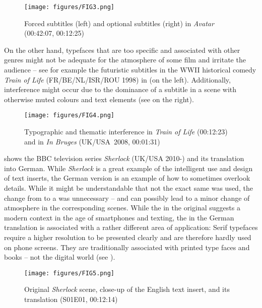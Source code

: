 \begin{figure}[t]
\texttt{[image: figures/FIG3.png]}
\caption{Forced subtitles (left) and optional subtitles (right) in \textit{Avatar} (00:42:07, 00:12:25)}
\label{fig:FIG3}
\end{figure}

On the other hand, typefaces that are too specific and associated with other genres might not be adequate for the atmosphere of some film and irritate the audience – see for example the futuristic subtitles in the WWII historical comedy \textit{Train of Life} (FR/BE/NL/ISR/ROU 1998) in  (on the left). Additionally, interference might occur due to the dominance of a subtitle in a scene with otherwise muted colours and text elements (see  on the right).

\begin{figure}[t]
\texttt{[image: figures/FIG4.png]}
\caption{Typographic and thematic interference in \textit{Train of Life} (00:12:23) and in \textit{In Bruges} (UK/USA~2008, 00:01:31)}
\label{fig:FIG4}
\end{figure}

 shows the BBC television series \textit{Sherlock} (UK/USA 2010-) and its translation into German. While \textit{Sherlock} is a great example of the intelligent use and design of text inserts, the German version is an example of how to sometimes overlook  details. While it might be understandable that not the exact same  was used, the change from  to a   was unnecessary – and can possibly lead to a minor change of atmosphere in the corresponding scenes. While the   in the original suggests a modern context in the age of smartphones and texting, the   in the German translation is associated with a rather different area of application: Serif typefaces require a higher resolution to be presented clearly and are therefore hardly used on phone screens. They are traditionally associated with printed type faces and books – not the digital world (see ).

\begin{figure}
\texttt{[image: figures/FIG5.png]}
\caption{Original \textit{Sherlock} scene, close-up of the English text insert, and its translation (S01E01, 00:12:14)}
\label{fig:FIG5}
\end{figure}

